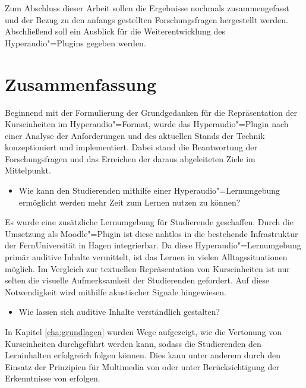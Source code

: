 Zum Abschluss dieser Arbeit sollen die Ergebnisse nochmals zusammengefasst und der Bezug zu den anfangs gestellten Forschungsfragen hergestellt werden. Abschließend soll ein Ausblick für die Weiterentwicklung des Hyperaudio"=Plugins gegeben werden.

\section{Zusammenfassung}
Beginnend mit der Formulierung der Grundgedanken für die Repräsentation der Kurseinheiten im Hyperaudio"=Format, wurde das Hyperaudio"=Plugin nach einer Analyse der Anforderungen und des aktuellen Stands der Technik konzeptioniert und implementiert. Dabei stand die Beantwortung der Forschungsfragen und das Erreichen der daraus abgeleiteten Ziele im Mittelpunkt.

\begin{itemize}
\item Wie kann den Studierenden mithilfe einer Hyperaudio"=Lernumgebung ermöglicht werden mehr Zeit zum Lernen nutzen zu können?
\end{itemize}

\hfill\begin{minipage}{\textwidth-1cm}
\vspace{0.1cm}
Es wurde eine zusätzliche Lernumgebung für Studierende geschaffen. Durch die Umsetzung als Moodle"=Plugin ist diese nahtlos in die bestehende Infrastruktur der FernUniversität in Hagen integrierbar. Da diese Hyperaudio"=Lernumgebung primär auditive Inhalte vermittelt, ist das Lernen in vielen Alltagssituationen möglich. Im Vergleich zur textuellen Repräsentation von Kurseinheiten ist nur selten die visuelle Aufmerksamkeit der Studierenden gefordert. Auf diese Notwendigkeit wird mithilfe akustischer Signale hingewiesen.
\vspace{0.25cm}
\end{minipage}

\begin{itemize}
\item Wie lassen sich auditive Inhalte verständlich gestalten?
\end{itemize}

\hfill\begin{minipage}{\textwidth-1cm}
\vspace{0.1cm}
In Kapitel \ref{cha:grundlagen} wurden Wege aufgezeigt, wie die Vertonung von Kurseinheiten durchgeführt werden kann, sodass die Studierenden den Lerninhalten erfolgreich folgen können. Dies kann unter anderem durch den Einsatz der Prinzipien für Multimedia von \cite{mayer2009multimedia} oder unter Berücksichtigung der Erkenntnisse von \cite{donker2007gestaltung} erfolgen.
\vspace{0.25cm}
\end{minipage}

